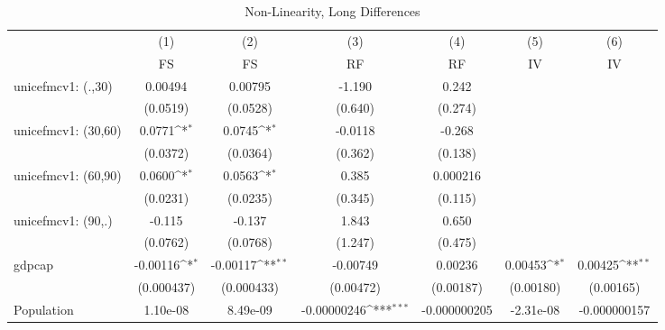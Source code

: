 \begin{table}[htbp]\centering
\def\sym#1{\ifmmode^{#1}\else\(^{#1}\)\fi}
\caption{Non-Linearity, Long Differences}
\begin{tabular}{l*{6}{c}}
\toprule
                &\multicolumn{1}{c}{(1)}&\multicolumn{1}{c}{(2)}&\multicolumn{1}{c}{(3)}&\multicolumn{1}{c}{(4)}&\multicolumn{1}{c}{(5)}&\multicolumn{1}{c}{(6)}\\
                &\multicolumn{1}{c}{FS}&\multicolumn{1}{c}{FS}&\multicolumn{1}{c}{RF}&\multicolumn{1}{c}{RF}&\multicolumn{1}{c}{IV}&\multicolumn{1}{c}{IV}\\
\midrule
unicefmcv1: (.,30)&  0.00494         &  0.00795         &   -1.190         &    0.242         &                  &                  \\
                & (0.0519)         & (0.0528)         &  (0.640)         &  (0.274)         &                  &                  \\
\addlinespace
unicefmcv1: (30,60)&   0.0771\sym{*}  &   0.0745\sym{*}  &  -0.0118         &   -0.268         &                  &                  \\
                & (0.0372)         & (0.0364)         &  (0.362)         &  (0.138)         &                  &                  \\
\addlinespace
unicefmcv1: (60,90)&   0.0600\sym{*}  &   0.0563\sym{*}  &    0.385         & 0.000216         &                  &                  \\
                & (0.0231)         & (0.0235)         &  (0.345)         &  (0.115)         &                  &                  \\
\addlinespace
unicefmcv1: (90,.)&   -0.115         &   -0.137         &    1.843         &    0.650         &                  &                  \\
                & (0.0762)         & (0.0768)         &  (1.247)         &  (0.475)         &                  &                  \\
\addlinespace
gdpcap          & -0.00116\sym{*}  & -0.00117\sym{**} & -0.00749         &  0.00236         &  0.00453\sym{*}  &  0.00425\sym{**} \\
                &(0.000437)         &(0.000433)         &(0.00472)         &(0.00187)         &(0.00180)         &(0.00165)         \\
\addlinespace
Population      & 1.10e-08         & 8.49e-09         &-0.00000246\sym{***}&-0.000000205         &-2.31e-08         &-0.000000157         \\

\end{tabular}
\end{table}
